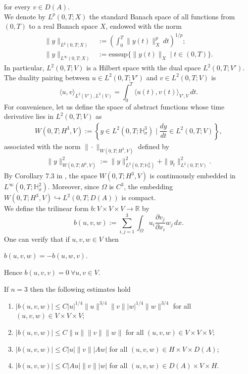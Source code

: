 \documentclass[reqno]{amsart}
\begin{document}
	for every $v\in D(A)$.\\
	We denote by $L^p(0,T;X)$ the standard Banach space of all functions from $(0,T)$ to a real Banach space $X$, endowed with the norm
	\begin{align*}  \|y\|_{L^p(0,T;X)} &:=\left(\int_{0}^{T}\|y(t)\|_{X}^{p}\,dt\right)^{1/p};\\
		\|y\|_{L^{\infty}(0,T;X)} &:= \mathrm{ess sup} \{\|y(t)\|_X\mid t\in (0,T)\}.
	\end{align*}
	In particular,  $L^2(0,T;V)$ is a Hilbert space with the dual space $L^2(0,T;V')$. The duality pairing between $u \in L^2(0,T;V')$ and $ v \in L^2(0,T;V)$ is
	\begin{equation*}
		\langle u,v\rangle_{L^2(V'),L^2(V)}=\int_{0}^{T}\langle u(t),v(t)\rangle_{V',V}\,dt.
	\end{equation*}
	For convenience, let us define the space of abstract functions  whose time derivative lies in $L^2(0,T;V)$ as
	\begin{align*}
		W(0,T;H^3,V):=\left\{y \in L^2(0,T;\mathbb{H}^3_{\sigma})\mid \dfrac{dy}{dt} \in L^2(0,T;V)\right\},
	\end{align*}
	associated with the norm $\|\cdot\|_{W(0,T;H^3,V)}$ defined by
	\begin{align*}
		\|y\|^2_{W(0,T;H^3,V)}:=\|y\|^2_{L^2(0,T;\mathbb{H}^3_{\sigma})} + \|y_t\|^2_{L^2(0,T;V)}.
	\end{align*}
	By Corollary 7.3 in \cite{robinson2003}, the space $W(0,T;H^3,V)$ is continuously embedded in $L^{\infty}(0,T;\mathbb{H}^2_{\sigma})$. Moreover, since $
	\Omega$ is $C^3$, the embedding $W(0,T;H^3,V) \hookrightarrow L^2(0,T;D(A))$ is compact.\\
	We define the trilinear form $b:V \times V\times V \to \mathbb{R}$ by
	\begin{equation}
		b(u,v,w):=\displaystyle\sum_{i,j=1}^{3}\int_{\Omega}u_i \dfrac{\partial v_j}{\partial x_i} w_j \,dx.
	\end{equation}
	One can verify that if $u,v,w \in V$ then\\
	\centerline{$b(u,v,w)=-b(u,w,v)$.}
	Hence $b(u,v,v)=0 \ \forall u,v \in V.$
	\begin{lemma}
		\label{lem2.1}
		If $n=3$ then the following estimates hold
		\begin{enumerate}
			\item $|b(u,v,w)| \leq C|u|^{1/4}\|u\|^{3/4} \|v\| |w|^{1/4}\|w\|^{3/4}$ for all $(u,v,w)\in V\times V \times V$;
			\item $|b(u,v,w)| \leq C\|u\| \|v\| \|w\|$ for all $(u,v,w)\in V\times V \times V$;
			\item $|b(u,v,w)| \leq C|u| \|v\||Aw|$ for all $(u,v,w)\in H \times V \times D(A)$;
			\item $|b(u,v,w)| \leq C|Au| \|v\| |w|$ for all $(u,v,w)\in D(A) \times V \times H$.
		\end{enumerate}
	\end{lemma}
\end{document}
